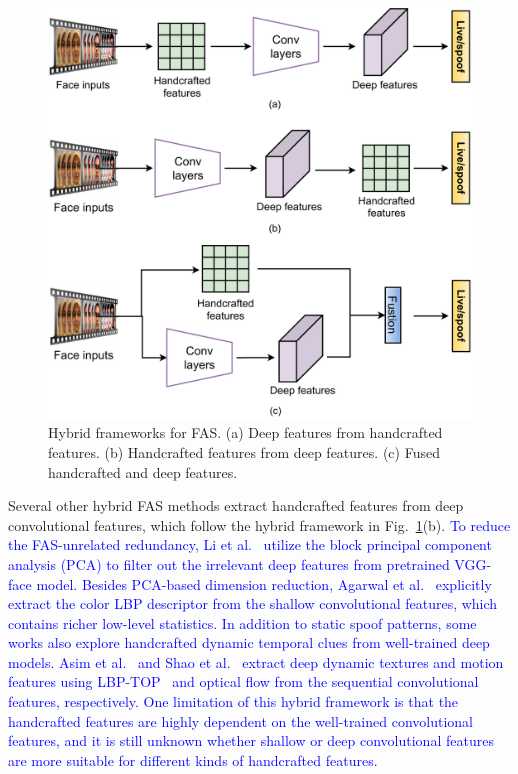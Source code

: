 \documentclass[10pt,journal,compsoc]{IEEEtran}
\begin{document}
\begin{figure}
\centering
\includegraphics[scale=0.47]{Figures/hybrid.pdf}
  \caption{ 
   Hybrid frameworks for FAS. (a) Deep features from handcrafted features. (b) Handcrafted features from deep features. (c) Fused handcrafted and deep features.
  }
\label{fig:hybrid}
\end{figure}


Several other hybrid FAS methods extract handcrafted features from deep convolutional features, which follow the hybrid framework in Fig.~\ref{fig:hybrid}(b). \textcolor{blue}{To reduce the FAS-unrelated redundancy, Li et al.~\cite{Li2017An} utilize the block principal component analysis (PCA) to filter out the irrelevant deep features from pretrained VGG-face model. Besides PCA-based dimension reduction, Agarwal et al.~\cite{agarwal2019chif} explicitly extract the color LBP descriptor from the shallow convolutional features, which contains richer low-level statistics. In addition to static spoof patterns, some works also explore handcrafted dynamic temporal clues from well-trained deep models. Asim et al.~\cite{asim2017cnn} and Shao et al.~\cite{shao2018joint} extract deep dynamic textures and motion features using LBP-TOP~\cite{zhao2007dynamic} and optical flow from the sequential convolutional features, respectively. One limitation of this hybrid framework is that the handcrafted features are highly dependent on the well-trained convolutional features, and it is still unknown whether shallow or deep convolutional features are more suitable for different kinds of handcrafted features.}
\end{document}
